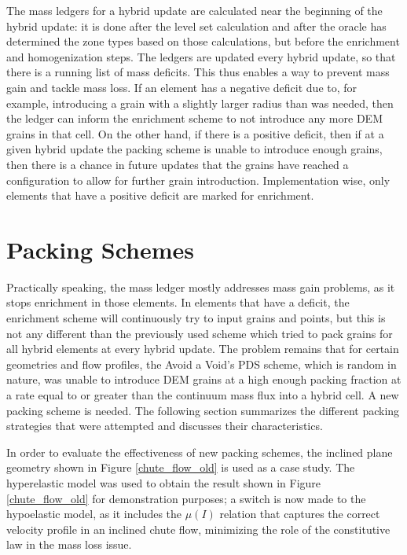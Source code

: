 The mass ledgers for a hybrid update are calculated near the beginning of the hybrid update: it is done after the level set calculation and after the oracle has determined the zone types based on those calculations, but before the enrichment and homogenization steps. The ledgers are updated every hybrid update, so that there is a running list of mass deficits. This thus enables a way to prevent mass gain and tackle mass loss. If an element has a negative deficit due to, for example, introducing a grain with a slightly larger radius than was needed, then the ledger can inform the enrichment scheme to not introduce any more DEM grains in that cell. On the other hand, if there is a positive deficit, then if at a given hybrid update the packing scheme is unable to introduce enough grains, then there is a chance in future updates that the grains have reached a configuration to allow for further grain introduction. Implementation wise, only elements that have a positive deficit are marked for enrichment.

\section{Packing Schemes}
Practically speaking, the mass ledger mostly addresses mass gain problems, as it stops enrichment in those elements. In elements that have a deficit, the enrichment scheme will continuously try to input grains and points, but this is not any different than the previously used scheme which tried to pack grains for all hybrid elements at every hybrid update. The problem remains that for certain geometries and flow profiles, the Avoid a Void's PDS scheme, which is random in nature, was unable to introduce DEM grains at a high enough packing fraction at a rate equal to or greater than the continuum mass flux into a hybrid cell. A new packing scheme is needed. The following section summarizes the different packing strategies that were attempted and discusses their characteristics.

In order to evaluate the effectiveness of new packing schemes, the inclined plane geometry shown in Figure \ref{chute_flow_old} is used as a case study. The hyperelastic model was used to obtain the result shown in Figure \ref{chute_flow_old} for demonstration purposes; a switch is now made to the hypoelastic model, as it includes the $\mu(I)$ relation that captures the correct velocity profile in an inclined chute flow, minimizing the role of the constitutive law in the mass loss issue.

